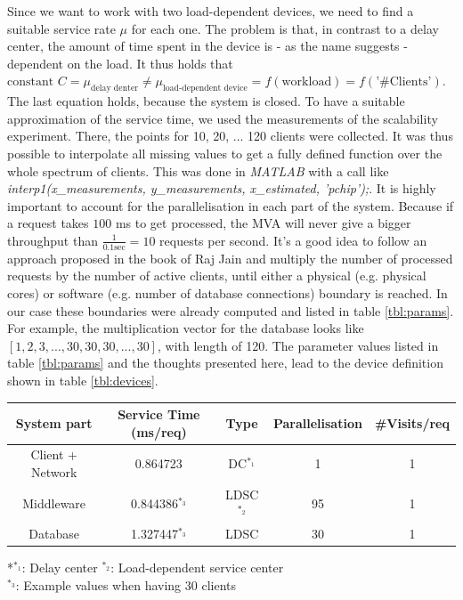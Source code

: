 \documentclass[11pt]{article}
\begin{document}
Since we want to work with two load-dependent devices, we need to find a suitable service rate $\mu$ for each one. The problem is that, in contrast to a delay center, the amount of time spent in the device is - as the name suggests - dependent on the load. It thus holds that $\text{constant }C=\mu_{\text{delay denter}}\neq\mu_{\text{load-dependent device}}=f(\text{workload})=f(\text{'\#Clients'})$. The last equation holds, because the system is closed. To have a suitable approximation of the service time, we used the measurements of the scalability experiment. There, the points for 10, 20, ... 120 clients were collected. It was thus possible to interpolate all missing values to get a fully defined function over the whole spectrum of clients. This was done in \textit{MATLAB} with a call like \textit{interp1(x\_measurements, y\_measurements, x\_estimated, 'pchip');}. It is highly important to account for the parallelisation in each part of the system. Because if a request takes $100$ ms to get processed, the MVA will never give a bigger throughput than $\frac{1}{0.1\text{sec}}=10$ requests per second. It's a good idea to follow an approach proposed in the book of Raj Jain and multiply the number of processed requests by the number of active clients, until either a physical (e.g. physical cores) or software (e.g. number of database connections) boundary is reached. In our case these boundaries were already computed and listed in table \ref{tbl:params}. For example, the multiplication vector for the database looks like $[1,2,3,...,30,30,30,...,30]$, with length of 120. The parameter values listed in table \ref{tbl:params} and the thoughts presented here, lead to the device definition shown in table \ref{tbl:devices}.
\begin{center}
	\begin{tabular}{c|c|c|c|c}
		\hline
		System part & Service Time (ms/req) & Type & Parallelisation & \#Visits/req\\
		\hline
		Client + Network & 0.864723 & DC$^{*_1}$ & 1 & 1\\
		Middleware & 0.844386$^{*_3}$ & LDSC$^{*_2}$ & 95 & 1 \\
		Database & 1.327447$^{*_3}$ & LDSC & 30 & 1 \\
		\hline
	\end{tabular}
	\label{tbl:devices}
	*{$^{*_1}$: Delay center $^{*_2}$: Load-dependent service center \\$^{*_3}$: Example values when having 30 clients}
\end{center}
\end{document}
